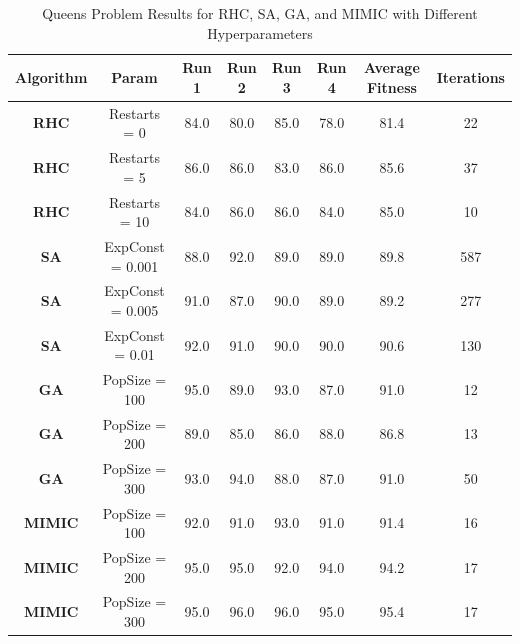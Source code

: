 \begin{table}[h!]
    \centering
    \caption{Queens Problem Results for RHC, SA, GA, and MIMIC with Different Hyperparameters}
    \begin{tabular}{|c|c|c|c|c|c|c|c|}
        \hline
        \textbf{Algorithm} & \textbf{Param} & \textbf{Run 1} & \textbf{Run 2} & \textbf{Run 3} & \textbf{Run 4} & \textbf{Average Fitness} & \textbf{Iterations} \\ \hline
        
        \textbf{RHC} & Restarts = 0 & 84.0 & 80.0 & 85.0 & 78.0 & 81.4 & 22 \\ \hline
        \textbf{RHC} & Restarts = 5 & 86.0 & 86.0 & 83.0 & 86.0 & 85.6 & 37 \\ \hline
        \textbf{RHC} & Restarts = 10 & 84.0 & 86.0 & 86.0 & 84.0 & 85.0 & 10 \\ \hline
        
        \textbf{SA} & ExpConst = 0.001 & 88.0 & 92.0 & 89.0 & 89.0 & 89.8 & 587 \\ \hline
        \textbf{SA} & ExpConst = 0.005 & 91.0 & 87.0 & 90.0 & 89.0 & 89.2 & 277 \\ \hline
        \textbf{SA} & ExpConst = 0.01 & 92.0 & 91.0 & 90.0 & 90.0 & 90.6 & 130 \\ \hline
        
        \textbf{GA} & PopSize = 100 & 95.0 & 89.0 & 93.0 & 87.0 & 91.0 & 12 \\ \hline
        \textbf{GA} & PopSize = 200 & 89.0 & 85.0 & 86.0 & 88.0 & 86.8 & 13 \\ \hline
        \textbf{GA} & PopSize = 300 & 93.0 & 94.0 & 88.0 & 87.0 & 91.0 & 50 \\ \hline
        
        \textbf{MIMIC} & PopSize = 100 & 92.0 & 91.0 & 93.0 & 91.0 & 91.4 & 16 \\ \hline
        \textbf{MIMIC} & PopSize = 200 & 95.0 & 95.0 & 92.0 & 94.0 & 94.2 & 17 \\ \hline
        \textbf{MIMIC} & PopSize = 300 & 95.0 & 96.0 & 96.0 & 95.0 & 95.4 & 17 \\ \hline
        
    \end{tabular}
    \label{tab:queens_results}
\end{table}
